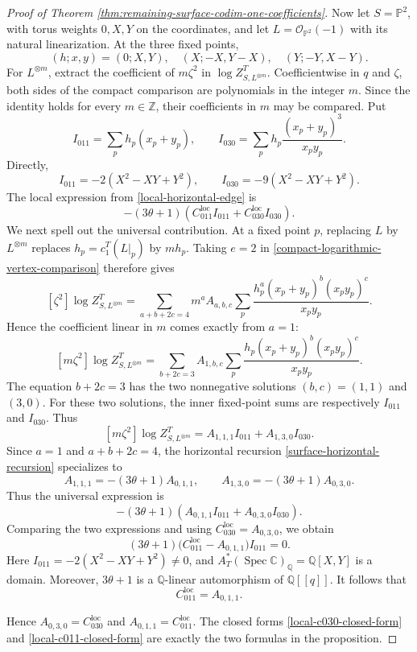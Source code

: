 \documentclass[10pt,a4paper]{amsart}
\renewcommand{\O}{\mathcal{O}}
\DeclareMathOperator{\Spec}{Spec}
\newcommand{\cc}{\mathbb{C}}
\newcommand{\q}{\mathbb{Q}}
\begin{document}
\begin{proof}[Proof of Theorem
  \ref{thm:remaining-surface-codim-one-coefficients}]
  Now let $S=\mathbb P^2$, with torus weights $0,X,Y$ on the coordinates,
  and let $L=\O_{\mathbb P^2}(-1)$ with its natural linearization. At the
  three fixed points,
  \[
    (h;x,y)=(0;X,Y),\quad (X;-X,Y-X),\quad (Y;-Y,X-Y).
  \]
  For $L^{\otimes m}$, extract the coefficient of $m\zeta^2$ in
  $\log Z^T_{S,L^{\otimes m}}$.  Coefficientwise in $q$ and $\zeta$,
  both sides of
  the compact comparison are polynomials in the integer $m$.  Since the
  identity holds for every $m\in\mathbb Z$, their coefficients in $m$ may
  be compared.  Put
  \[
    I_{011}=\sum_p h_p(x_p+y_p),\qquad
    I_{030}=\sum_p h_p\frac{(x_p+y_p)^3}{x_py_p}.
  \]
  Directly,
  \[
    I_{011}=-2(X^2-XY+Y^2),\qquad
    I_{030}=-9(X^2-XY+Y^2).
  \]
  The local expression from \eqref{local-horizontal-edge} is
  \[
    -(3\theta+1)
    \left(C_{011}^{\mathrm{loc}}I_{011}
    +C_{030}^{\mathrm{loc}}I_{030}\right).
  \]
  We next spell out the universal contribution.  At a fixed point $p$,
  replacing $L$ by $L^{\otimes m}$ replaces
  $h_p=c_1^T(L|_p)$ by $mh_p$.  Taking $e=2$ in
  \eqref{compact-logarithmic-vertex-comparison} therefore gives
  \[
    [\zeta^2]\log Z^T_{S,L^{\otimes m}}
    =
    \sum_{a+b+2c=4}m^aA_{a,b,c}
    \sum_p\frac{h_p^a(x_p+y_p)^b(x_py_p)^c}{x_py_p}.
  \]
  Hence the coefficient linear in $m$ comes exactly from $a=1$:
  \[
    [m\zeta^2]\log Z^T_{S,L^{\otimes m}}
    =
    \sum_{b+2c=3}A_{1,b,c}
    \sum_p\frac{h_p(x_p+y_p)^b(x_py_p)^c}{x_py_p}.
  \]
  The equation $b+2c=3$ has the two nonnegative solutions
  $(b,c)=(1,1)$ and $(3,0)$.  For these two solutions, the inner
  fixed-point sums are respectively $I_{011}$ and $I_{030}$.  Thus
  \[
    [m\zeta^2]\log Z^T_{S,L^{\otimes m}}
    =A_{1,1,1}I_{011}+A_{1,3,0}I_{030}.
  \]
  Since $a=1$ and $a+b+2c=4$, the horizontal recursion
  \eqref{surface-horizontal-recursion} specializes to
  \[
    A_{1,1,1}=-(3\theta+1)A_{0,1,1},\qquad
    A_{1,3,0}=-(3\theta+1)A_{0,3,0}.
  \]
  Thus the universal expression is
  \[
    -(3\theta+1)
    \left(A_{0,1,1}I_{011}+A_{0,3,0}I_{030}\right).
  \]
  Comparing the two expressions and using
  $C_{030}^{\mathrm{loc}}=A_{0,3,0}$, we obtain
  \[
    (3\theta+1)
    \bigl(C_{011}^{\mathrm{loc}}-A_{0,1,1}\bigr)I_{011}=0.
  \]
  Here $I_{011}=-2(X^2-XY+Y^2)\ne0$, and
  $A_T^*(\Spec\cc)_\q=\q[X,Y]$ is a domain.  Moreover,
  $3\theta+1$ is a $\q$-linear automorphism of $\q[[q]]$.
  It follows that
  \[
    C_{011}^{\mathrm{loc}}=A_{0,1,1}.
  \]

  Hence $A_{0,3,0}=C_{030}^{\mathrm{loc}}$ and
  $A_{0,1,1}=C_{011}^{\mathrm{loc}}$. The closed forms
  \eqref{local-c030-closed-form} and \eqref{local-c011-closed-form} are exactly
  the two formulas in the proposition.
\end{proof}
\end{document}
